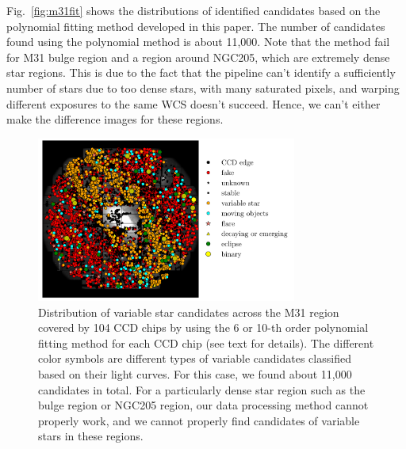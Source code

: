 \documentclass[iop, apj]{emulateapj}
\newcommand{\?}{\stackrel{?}{=}}
\begin{document}
\begin{itemize}
%
Fig.~\ref{fig:m31fit} shows %
the distributions of identified candidates based on %
the polynomial fitting method developed in this paper. %
The number of candidates found using the polynomial method is about 11,000. %
Note that %
the method %
fail for M31 bulge region and a region around NGC205, which are extremely dense star regions. This is due to the fact that the pipeline can't identify a sufficiently number of stars due to too dense stars, with many saturated pixels, and warping different exposures to the same WCS doesn't succeed. Hence, we can't either make the difference images for these regions. 
%
\begin{figure}[t]
\centering
\includegraphics[width=8.55cm,clip]{pic/m31_fit6order.pdf}
\caption{\small{Distribution of variable star candidates across the M31 region covered by 104 CCD chips by using the 6 or 10-th order polynomial fitting method for each CCD chip (see text for details). 
The different color symbols are different types of variable candidates classified based on their light curves. 
For this case, we found about 11,000 candidates in total. For a particularly dense star region such as the bulge region or NGC205 region, our data processing method cannot properly work, and we cannot properly find candidates of variable stars in these regions. }}

\end{figure}
\end{itemize}
\end{document}
